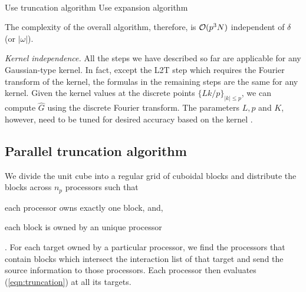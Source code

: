{\tt
\begin{algorithmic}
\STATE
     \STATE Use truncation algorithm 
  \ELSE 
     \STATE Use expansion algorithm
  \ENDIF
\STATE
\end{algorithmic}
}

The complexity of the overall algorithm, therefore, is $\mathcal{O}(p^3 N)$ independent of $\delta$ (or $|\omega|$).  

{\em Kernel independence.} All the steps we have described so far are applicable for any Gaussian-type kernel. 
In fact, except the L2T step which requires the Fourier transform of the kernel, the formulas in the remaining steps are the same for any kernel. Given the kernel values at the discrete points $\{Lk/p \}_{|k| \leq p}$, we can compute $\hat{G}$ using the discrete Fourier transform. The parameters $L, p$ and $K$, however, need to be tuned for desired accuracy based on the kernel \cite{fggt}. 

\subsection{Parallel truncation algorithm}
\label{sc:parallelTruncation}
We divide the unit cube into a regular grid of cuboidal blocks and distribute the blocks across $n_p$ processors
 such that \begin{inparaenum}
\item each processor owns exactly one block, and, \item each block is owned by an unique processor\end{inparaenum}.
 For each target owned by a particular processor, we find the processors that contain blocks which intersect the interaction list of that target and send the source information to those processors. Each processor then evaluates (\ref{eqn:truncation}) at all its targets.
 
